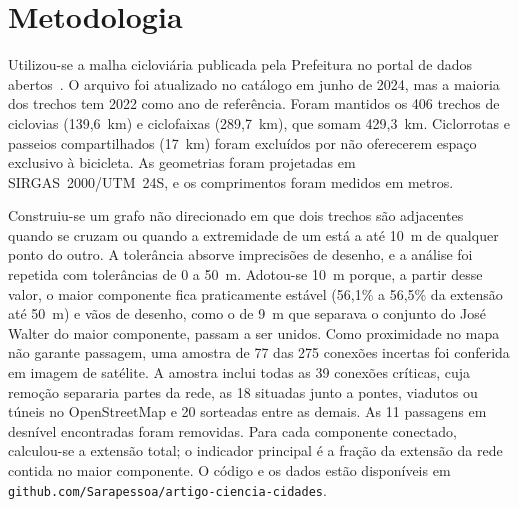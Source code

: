 \documentclass[10pt,twoside,a4paper]{article}
\begin{document}
\section{Metodologia}
Utilizou-se a malha cicloviária publicada pela Prefeitura no portal de dados abertos~\cite{fortaleza2024}. O arquivo foi atualizado no catálogo em junho de 2024, mas a maioria dos trechos tem 2022 como ano de referência. Foram mantidos os 406 trechos de ciclovias (139,6~km) e ciclofaixas (289,7~km), que somam 429,3~km. Ciclorrotas e passeios compartilhados (17~km) foram excluídos por não oferecerem espaço exclusivo à bicicleta. As geometrias foram projetadas em SIRGAS~2000/UTM~24S, e os comprimentos foram medidos em metros.

Construiu-se um grafo não direcionado em que dois trechos são adjacentes quando se cruzam ou quando a extremidade de um está a até 10~m de qualquer ponto do outro. A tolerância absorve imprecisões de desenho, e a análise foi repetida com tolerâncias de 0 a 50~m. Adotou-se 10~m porque, a partir desse valor, o maior componente fica praticamente estável (56,1\% a 56,5\% da extensão até 50~m) e vãos de desenho, como o de 9~m que separava o conjunto do José Walter do maior componente, passam a ser unidos. Como proximidade no mapa não garante passagem, uma amostra de 77 das 275 conexões incertas foi conferida em imagem de satélite. A amostra inclui todas as 39 conexões críticas, cuja remoção separaria partes da rede, as 18 situadas junto a pontes, viadutos ou túneis no OpenStreetMap e 20 sorteadas entre as demais. As 11 passagens em desnível encontradas foram removidas. Para cada componente conectado, calculou-se a extensão total; o indicador principal é a fração da extensão da rede contida no maior componente. O código e os dados estão disponíveis em \texttt{github.com/Sarapessoa/artigo-ciencia-cidades}.

\end{document}

